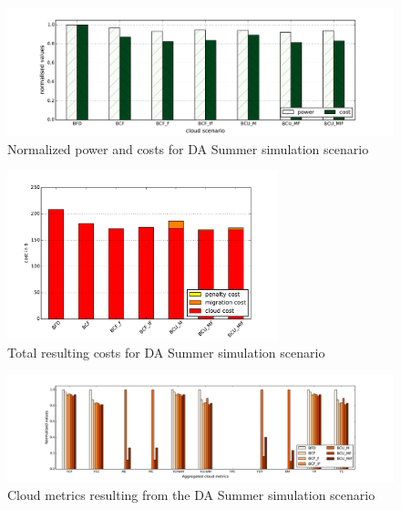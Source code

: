 \begin{figure}[tbp]
	\centering
		\includegraphics[width=1.00\textwidth]{figures/evaluation_and_results/DA_Summer_power_vs_cost.pdf}
	\caption{Normalized power and costs for DA Summer simulation scenario}
	\label{fig:DA_Summer_power_vs_cost}
\end{figure}

\begin{figure}[htbp]
	\centering
	\vspace*{-0.2in}
		\includegraphics[width=0.7\textwidth]{figures/evaluation_and_results/DA_Summer_total_cost.pdf}
	\caption{Total resulting costs for DA Summer simulation scenario}
	\label{fig:DA_Summer_total_cost}
\end{figure}

\begin{figure}[bp]
	\centering
	\vspace*{-0.2in}
	\hspace*{-1.6in}
		\includegraphics[width=1.50\textwidth]{figures/evaluation_and_results/DA_Summer_cloud_metrics.pdf}
	\caption{Cloud metrics resulting from the DA Summer simulation scenario}
	\label{fig:DA_Summer_cloud_metrics}
\end{figure}




